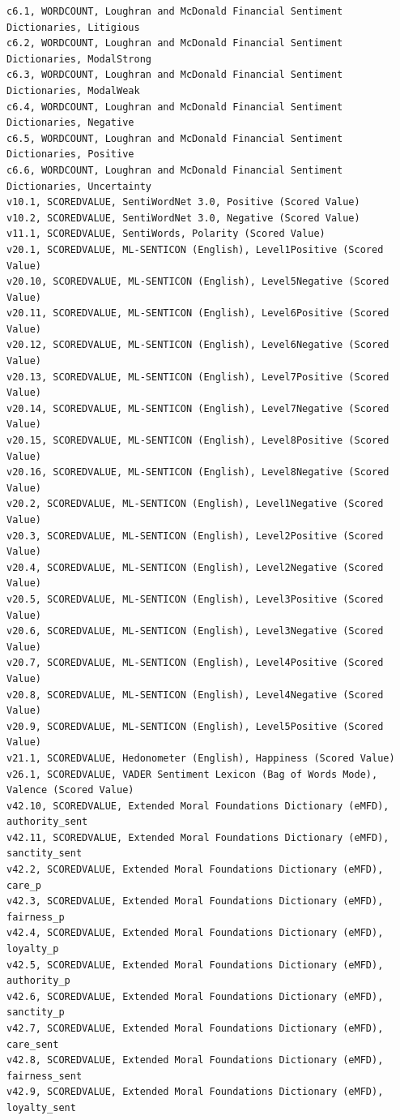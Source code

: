 \documentclass[12pt]{article}
\begin{document}
\begin{verbatim}
c6.1, WORDCOUNT, Loughran and McDonald Financial Sentiment Dictionaries, Litigious
c6.2, WORDCOUNT, Loughran and McDonald Financial Sentiment Dictionaries, ModalStrong
c6.3, WORDCOUNT, Loughran and McDonald Financial Sentiment Dictionaries, ModalWeak
c6.4, WORDCOUNT, Loughran and McDonald Financial Sentiment Dictionaries, Negative
c6.5, WORDCOUNT, Loughran and McDonald Financial Sentiment Dictionaries, Positive
c6.6, WORDCOUNT, Loughran and McDonald Financial Sentiment Dictionaries, Uncertainty
v10.1, SCOREDVALUE, SentiWordNet 3.0, Positive (Scored Value)
v10.2, SCOREDVALUE, SentiWordNet 3.0, Negative (Scored Value)
v11.1, SCOREDVALUE, SentiWords, Polarity (Scored Value)
v20.1, SCOREDVALUE, ML-SENTICON (English), Level1Positive (Scored Value)
v20.10, SCOREDVALUE, ML-SENTICON (English), Level5Negative (Scored Value)
v20.11, SCOREDVALUE, ML-SENTICON (English), Level6Positive (Scored Value)
v20.12, SCOREDVALUE, ML-SENTICON (English), Level6Negative (Scored Value)
v20.13, SCOREDVALUE, ML-SENTICON (English), Level7Positive (Scored Value)
v20.14, SCOREDVALUE, ML-SENTICON (English), Level7Negative (Scored Value)
v20.15, SCOREDVALUE, ML-SENTICON (English), Level8Positive (Scored Value)
v20.16, SCOREDVALUE, ML-SENTICON (English), Level8Negative (Scored Value)
v20.2, SCOREDVALUE, ML-SENTICON (English), Level1Negative (Scored Value)
v20.3, SCOREDVALUE, ML-SENTICON (English), Level2Positive (Scored Value)
v20.4, SCOREDVALUE, ML-SENTICON (English), Level2Negative (Scored Value)
v20.5, SCOREDVALUE, ML-SENTICON (English), Level3Positive (Scored Value)
v20.6, SCOREDVALUE, ML-SENTICON (English), Level3Negative (Scored Value)
v20.7, SCOREDVALUE, ML-SENTICON (English), Level4Positive (Scored Value)
v20.8, SCOREDVALUE, ML-SENTICON (English), Level4Negative (Scored Value)
v20.9, SCOREDVALUE, ML-SENTICON (English), Level5Positive (Scored Value)
v21.1, SCOREDVALUE, Hedonometer (English), Happiness (Scored Value)
v26.1, SCOREDVALUE, VADER Sentiment Lexicon (Bag of Words Mode), Valence (Scored Value)
v42.10, SCOREDVALUE, Extended Moral Foundations Dictionary (eMFD), authority_sent
v42.11, SCOREDVALUE, Extended Moral Foundations Dictionary (eMFD), sanctity_sent
v42.2, SCOREDVALUE, Extended Moral Foundations Dictionary (eMFD), care_p
v42.3, SCOREDVALUE, Extended Moral Foundations Dictionary (eMFD), fairness_p
v42.4, SCOREDVALUE, Extended Moral Foundations Dictionary (eMFD), loyalty_p
v42.5, SCOREDVALUE, Extended Moral Foundations Dictionary (eMFD), authority_p
v42.6, SCOREDVALUE, Extended Moral Foundations Dictionary (eMFD), sanctity_p
v42.7, SCOREDVALUE, Extended Moral Foundations Dictionary (eMFD), care_sent
v42.8, SCOREDVALUE, Extended Moral Foundations Dictionary (eMFD), fairness_sent
v42.9, SCOREDVALUE, Extended Moral Foundations Dictionary (eMFD), loyalty_sent
\end{verbatim}
\end{document}
